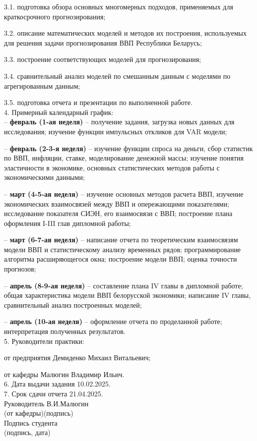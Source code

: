 \documentclass[a4paper, 14pt]{extreport}
\numberwithin{equation}{section}
\numberwithin{equation}{section}
\begin{document}
	3.1. подготовка обзора основных многомерных подходов, применяемых для краткосрочного прогнозирования;
	
	3.2. описание математических моделей и методов их построения, используемых для решения задачи прогнозирования ВВП Республики Беларусь;
	
	3.3. построение соответствующих моделей для прогнозирования;
	
	3.4. сравнительный анализ моделей по смешанным данным с моделями по агрегированным данным;
	
	3.5. подготовка отчета и презентации по выполненной работе.\\[6mm]
	4. Примерный календарный график:\\[6mm]
	
	-- \textbf{февраль (1-ая неделя)} -- получение задания, загрузка новых данных для исследования; изучение функции импульсных откликов для VAR модели;
	
	-- \textbf{февраль (2-3-я неделя)} -- изучение функции спроса на деньги, сбор статистик по ВВП, инфляции, ставке, моделирование денежной массы; изучение понятия эластичности в экономике, основных статистических методов работы с экономическими данными;
	
	-- \textbf{март (4-5-ая неделя)} -- изучение основных методов расчета ВВП, изучение экономических взаимосвязей между ВВП и опережающими показателями; исследование показателя СИЭН, его взаимосвязи с ВВП; построение плана оформления I-III глав дипломной работы;
	
	-- \textbf{март (6-7-ая неделя)} -- написание отчета по теоретическим взаимосвязям модели ВВП и статистическому анализу временных рядов; программирование алгоритма расширяющегося окна; построение модели ВВП; оценка точности прогнозов;
	
	-- \textbf{апрель (8-9-ая неделя)} -- составление плана IV главы в дипломной работе; общая характеристика модели ВВП белорусской экономики; написание IV главы, сравнительный анализ построенных моделей;
	
	
	-- \textbf{апрель (10-ая неделя)} -- оформление отчета по проделанной работе; интерпретация полученных результатов.\\[6mm]
	5. Руководители практики:
	
	от предприятия Демиденко Михаил Витальевич;
	
	от кафедры Малюгин Владимир Ильич.\\[6mm]
	6. Дата выдачи задания 10.02.2025.\\[6mm]
	7. Срок сдачи отчета\hspace*{0.7cm} 21.04.2025.\\[10mm]
	Руководитель \underline{\hspace*{4cm}} В.И.Малюгин\\[-2mm]
	{\scriptsize(от кафедры)\hspace*{1.5cm}(подпись)}\\[2ex]
	\noindent Подпись студента \underline{\hspace*{6cm}} \\[-2mm]
	{\scriptsize\hspace*{6cm}(подпись, дата)}\\[2ex]
	\newpage
	
\end{document}
